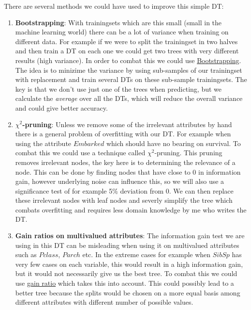 \documentclass[11pt, english]{../Template/NTNUoving}
\begin{document}
\begin{oppgave}
\begin{punkt}
        There are several methods we could have used to improve this simple DT:
        \begin{enumerate}
            \item \textbf{Bootstrapping}: With trainingsets which are this small (small in the machine learning world) there can be a lot of variance when training on different data.
            For example if we were to split the trainingset in two halves and then train a DT on each one we could get two trees with very different results (high variance). In order to
            combat this we could use \href{https://towardsdatascience.com/boosting-the-accuracy-of-your-machine-learning-models-f878d6a2d185}{Bootstrapping}. The idea is to minizime the variance by
            using sub-samples of our trainingset with replacement and train several DTs on these sub-sample trainingsets. The key is that we don't use just one of the trees when predicting, but we calculate the
            \textit{average} over all the DTs, which will reduce the overall variance and could give better accuracy.
            \item \textbf{$\chi^2$-pruning}: Unless we remove some of the irrelevant attributes by hand there is a general problem of overfitting with our DT. For example when using the attribute $Embarked$ which should have no bearing
            on survival. To combat this we could use a technique called $\chi^2$-pruning. This pruning removes irrelevant nodes, the key here is to determining the relevance of a node.
            This can be done by finding nodes that have close to 0 in information gain, however underlying noise can influence this, so we will also use a significance test of for example 5\% deviation from 0.
            We can then replace these irrelevant nodes with leaf nodes and severly simplify the tree which combats overfitting and requires less domain knowledge by me who writes the DT.
            \item \textbf{Gain ratios on multivalued attributes}: The information gain test we are using in this DT can be misleading when using it on multivalued attributes such as $Pclass$, $Parch$ etc.
            In the extreme cases for example when $SibSp$ has very few cases on each variable, this would result in a high information gain, but it would not necessarily give us the best tree. To combat this we could
            use \href{https://en.wikipedia.org/wiki/Information_gain_ratio}{gain ratio} which takes this into account. This could possibly lead to a better tree because the splits would be chosen on a more equal basis among different
            attributes with different number of possible values.
        \end{enumerate}
    \end{punkt}
\end{oppgave}
\end{document}
